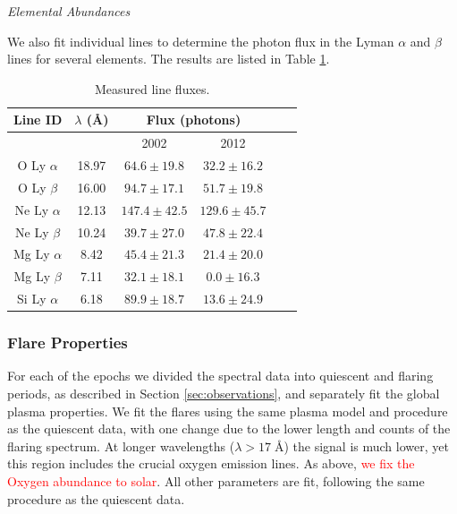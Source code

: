 \documentclass[twocolumn]{aastex631}
\newcommand{\red}[1]{\textcolor{red}{#1}}
\begin{document}
\textit{Elemental Abundances}\label{sec:su_aur_abundance}

We also fit individual lines to determine the photon flux in the Lyman $\alpha$ and $\beta$ lines for several elements. The results are listed in Table \ref{table:line_fits}.

\begin{table}[t]
    \centering
    \begin{tabular}{|c|c|c|c|c|c|}
    \hline
    Line ID & $\lambda$ (\AA) & \multicolumn{2}{c|}{Flux (photons)}\\
    \hline
                   &       & 2002 & 2012  \\
    \hline
    O Ly $\alpha$  & 18.97 & $64.6 \pm 19.8$  &  $32.2 ± 16.2$ \\  %
    O Ly $\beta$   & 16.00 & $94.7 \pm 17.1$  &  $51.7 \pm 19.8$ \\ %
    Ne Ly $\alpha$ & 12.13 & $147.4 \pm 42.5$ & $129.6 \pm 45.7$ \\
    Ne Ly $\beta$  & 10.24 & $ 39.7 \pm 27.0$ &  $47.8 \pm 22.4$ \\
    Mg Ly $\alpha$ &  8.42 & $45.4 \pm 21.3$ &  $21.4 \pm 20.0$ \\ %
    Mg Ly $\beta$  &  7.11 & $32.1 \pm 18.1$ &  $0.0 \pm 16.3$ \\ %
    Si Ly $\alpha$ &  6.18 & $89.9 \pm 18.7$ &  $13.6 \pm 24.9$ \\ %
    \hline   
    \end{tabular}
    \caption{Measured line fluxes.}
    \label{table:line_fits}
\end{table}

\subsubsection{Flare Properties}\label{sec:su_aur_flare}
For each of the epochs we divided the spectral data into quiescent and flaring periods, as described in Section \ref{sec:observations}, and separately fit the global plasma properties. We fit the flares using the same plasma model and procedure as the quiescent data, with one change due to the lower length and counts of the flaring spectrum.
At longer wavelengths ($\lambda > 17\;$\AA{}) the signal is much lower, yet this region includes the crucial oxygen emission lines. As above, \red{we fix the Oxygen abundance to solar}. All other parameters are fit, following the same procedure as the quiescent data.
\end{document}

